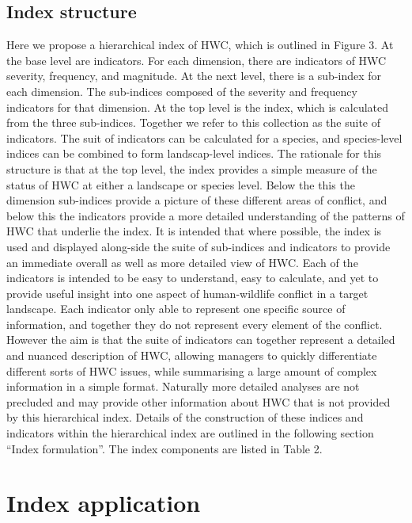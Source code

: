 \documentclass[fleqn,10pt]{olplainarticle}
\begin{document}
 
\subsection*{Index structure}
Here we propose a hierarchical index of HWC, which is outlined in Figure 3. At the base level are indicators. For each dimension, there are indicators of HWC severity, frequency, and magnitude. At the next level, there is a sub-index for each dimension. The sub-indices composed of the severity and frequency indicators for that dimension. At the top level is the index, which is calculated from the three sub-indices. Together we refer to this collection as the suite of indicators. The suit of indicators can be calculated for a species, and species-level indices can be combined to form landscap-level indices.
The rationale for this structure is that at the top level, the index provides a simple measure of the status of HWC at either a landscape or species level. Below the this the dimension sub-indices provide a picture of these different areas of conflict, and below this the indicators provide a more detailed understanding of the patterns of HWC that underlie the index. It is intended that where possible, the index is used and displayed along-side the suite of sub-indices and indicators to provide an immediate overall as well as more detailed view of HWC. Each of the indicators is intended to be easy to understand, easy to calculate, and yet to provide useful insight into one aspect of human-wildlife conflict in a target landscape. Each indicator only able to represent one specific source of information, and together they do not represent every element of the conflict. However the aim is that the suite of indicators can together represent a detailed and nuanced description of HWC, allowing managers to quickly differentiate different sorts of HWC issues, while summarising a large amount of complex information in a simple format. Naturally more detailed analyses are not precluded and may provide other information about HWC that is not provided by this hierarchical index. 
Details of the construction of these indices and indicators within the hierarchical index are outlined in the following section “Index formulation”. The index components are listed in Table 2.

\section*{Index application}
\end{document}
